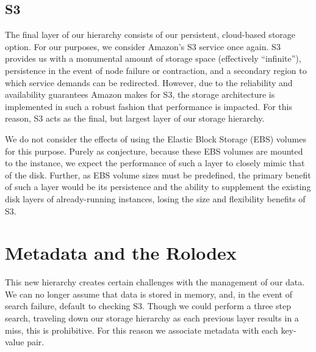 \subsection{S3} %
\label{sub:storage_cloud}
The final layer of our hierarchy consists of our persistent, cloud-based
storage option. For our purposes, we consider Amazon's S3 service once again.
S3 provides us with a monumental amount of storage space (effectively
``infinite''), persistence in the event of node failure or contraction, and a
secondary region to which service demands can be redirected. However, due to
the reliability and availability guarantees Amazon makes for S3, the storage
architecture is implemented in such a robust fashion that performance is
impacted. For this reason, S3 acts as the final, but largest layer of our
storage hierarchy.

We do not consider the effects of using the Elastic Block Storage (EBS) volumes
for this purpose. Purely as conjecture, because these EBS volumes are mounted
to the instance, we expect the performance of such a layer to closely mimic
that of the disk. Further, as EBS volume sizes must be predefined, the primary
benefit of such a layer would be its persistence and the ability to supplement
the existing disk layers of already-running instances, losing the size and
flexibility benefits of S3.


\section{Metadata and the Rolodex} %
\label{sec:rolodex}
This new hierarchy creates certain challenges with the management of our data.
We can no longer assume that data is stored in memory, and, in the event of
search failure, default to checking S3. Though we could perform a three
step search, traveling down our storage hierarchy as each previous layer
results in a miss, this is prohibitive. For this reason we associate metadata
with each key-value pair.

